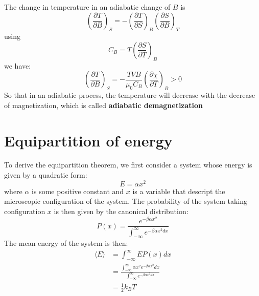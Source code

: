 \documentclass{article}
\newcommand{\pfrac}[2]{\frac{\partial #1}{\partial #2}}
\begin{document}
The change in temperature in an adiabatic change of $B$ is 
\begin{equation}
    \left( \pfrac{T}{B} \right)_S = - \left( \pfrac{T}{S} \right)_B \left( \pfrac{S}{B} \right)_T
\end{equation}
using 
\begin{equation}
    C_B = T \left( \pfrac{S}{T} \right)_B    
\end{equation}
we have:
\begin{equation}
    \left( \pfrac{T}{B} \right)_S = - \frac{TVB}{\mu_0 C_B} \left(\pfrac{\chi}{T}\right)_B > 0
\end{equation}
So that in an adiabatic process, the temperature will decrease with the decrease of magnetization,
which is called \textbf{adiabatic demagnetization}

\section{Equipartition of energy}
To derive the equipartition theorem, we first consider a system
whose energy is given by a quadratic form:
\begin{equation}
    E = \alpha x^2
\end{equation}
where $\alpha$ is some positive constant and $x$ is a variable
that descript the microscopic configuration of the system. The 
probability of the system taking configuration $x$ is then 
given by the canonical distribution:
\begin{equation}
    P(x) = \frac{e^{-\beta \alpha x^2}}{\int_{-\infty}^{\infty} e^{-\beta \alpha x^2 dx}}
\end{equation}
The mean energy of the system is then:
\begin{align}
    \langle E \rangle &= \int_{-\infty}^{\infty} E P(x) dx \\
        & = \frac{\int_{-\infty}^{\infty} \alpha x^2 e^{-\beta \alpha x^2} dx}{\int_{-\infty}^{\infty} e^{-\beta \alpha x^2 dx}} \\
        & = \frac{1}{2} k_B T
\end{align}
\end{document}
